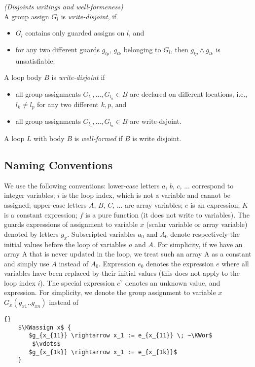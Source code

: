 \documentclass[a4paper,10pt]{article}
\newcommand{\idx}{\ensuremath{i}\xspace}
\newcommand{\KWassign}{\ensuremath{\mathrm{\textbf{assign}}~}}
\newcommand{\KWor}{\ensuremath{\mathrm{\textbf{or}}~}}
\newcommand{\group}[2]{\ensuremath{\mathit{G}_{#1}(#2)}\xspace}
\newenvironment{definition}[1][Definition]{\begin{trivlist}
\item[\hskip \labelsep {\bfseries #1}]}{\end{trivlist}}
\begin{document}
\begin{definition} \emph{(Disjoints writings and well-formeness)}\\
A group assign $G_l$ is \textit{write-disjoint}, if 
\begin{itemize}
\item[i.] $G_l$  contains only guarded assigns on $l$, and
\item[ii.] for any two different guards $g_{lp}$, $g_{lk}$ belonging to $G_l$,
           then $g_{lp} \land g_{lk}$ is unsatisfiable.
\end{itemize}
A loop body $B$ is \textit{write-disjoint} if 
\begin{itemize}
\item[i.] all group assignments $G_{l_1}, \ldots, G_{l_n} \in B$ are declared 
          on different locations, i.e., $l_k \neq l_p$ for any two different $k,p$, and
\item[ii.] all group assignments $G_{l_1}, \ldots, G_{l_n} \in B$ are write-dsjoint.
\end{itemize}
A loop $L$ with body $B$ is \textit{well-formed} if $B$ is write disjoint.
\end{definition}

\subsection{Naming Conventions}
\label{sec:naming-conventions}

We use the following conventions: lower-case letters $a$, $b$, $c$,
... correspond to  integer
variables; \idx is the loop index, which is not a variable and cannot be
assigned; upper-case letters $A$, $B$, $C$, ... are array variables; $e$ is an
expression; $K$ is a constant expression; $f$ is a pure function (it does not
write to variables). The guards expressions of assignment to variable $x$ (scalar variable or
array variable) denoted by letters $g_x$. Subscripted variables $a_0$ and $A_0$ denote
respectively the initial values before the loop of variables $a$ and $A$.
For simplicity, if we have an array A that is never updated in the loop, we
treat such an array A as a constant and simply use $A$ instead of $A_0$. 
Expression $e_0$ denotes the expression $e$ where all variables have been replaced by their 
initial values (this does not apply to the loop index \idx).  
The special expression $e^?$ denotes an unknown value, and expression. 
For simplicity, we denote the group assignment to variable $x$  
$\group{x}{g_{x1} .. g_{xn}}$ instead of  
{
\begin{lstlisting}[mathescape]{} 
    $\KWassign x$ {
       $g_{x_{11}} \rightarrow x_1 := e_{x_{11}} \; ~\KWor$
        $\vdots$
       $g_{x_{1k}} \rightarrow x_1 := e_{x_{1k}}$
    }
\end{lstlisting}
}
\end{document}
